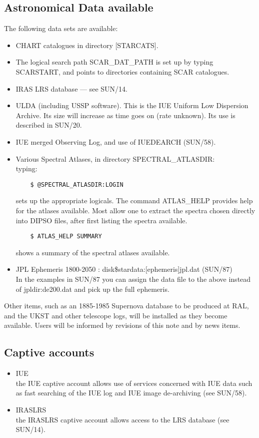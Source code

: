 \subsection{Astronomical Data available}

The following data sets are available:
\begin{itemize}
\item CHART catalogues in directory [STARCATS].
\item The logical search path SCAR\_DAT\_PATH is set up by typing
SCARSTART, and points to directories containing SCAR catalogues.
\item IRAS LRS database --- see SUN/14.
\item ULDA (including USSP software).
This is the IUE Uniform Low Dispersion Archive.
Its size will increase as time goes on (rate unknown).
Its use is described in SUN/20.
\item IUE merged Observing Log, and use of IUEDEARCH (SUN/58).
\item Various Spectral Atlases, in directory SPECTRAL\_ATLASDIR:\\
      typing:
\begin{verbatim}
    $ @SPECTRAL_ATLASDIR:LOGIN
\end{verbatim}
sets up the appropriate logicals. The command ATLAS\_HELP provides help for
the atlases available. Most allow one to extract the spectra chosen directly
into DIPSO files,  after first listing the spectra available.
\begin{verbatim}
    $ ATLAS_HELP SUMMARY
\end{verbatim}
shows a summary of the spectral atlases available.
\item    JPL Ephemeris 1800-2050  : disk\$stardata:[ephemeris]jpl.dat (SUN/87)\\
         In the examples in SUN/87 you can assign the data file to the
         above instead of jpldir:de200.dat and pick up the full ephemeris.
\end{itemize}
Other items, such as an 1885-1985 Supernova database to be produced at RAL, and
the UKST and other telescope logs, will be installed as they become available.
Users will be informed by revisions of this note and by news items.

\subsection{Captive accounts}

\begin{itemize}

\item IUE \\
the IUE captive account allows use of services 
concerned with IUE data such as fast searching of the IUE log
and IUE image de-archiving (see SUN/58).
\item IRASLRS\\
the IRASLRS captive account allows access to the LRS database (see SUN/14).
\end{itemize}


